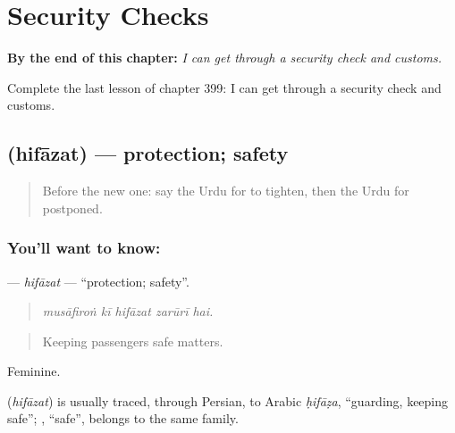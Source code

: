
\chapter{Security Checks}
\label{ch:ur-security-checks}

\begin{chapteropening}
\textbf{By the end of this chapter:} \emph{I can get through a security check and customs.}

Complete the last lesson of chapter 399: I can get through a security check and customs.
\end{chapteropening}

\section[\texorpdfstring{\ur{حفاظت} (hifāzat)}{حفاظت (hifāzat)}]{ (hifāzat) — protection; safety}

\label{lesson:UR-C399-hifazat}



\begin{quote}
Before the new one: say the Urdu for to tighten, then the Urdu for postponed.
\end{quote}

\subsection*{You'll want to know: }
\textbf{} — \emph{hifāzat} — \textquotedblleft{}protection; safety\textquotedblright{}.

\begin{quote}
    
\end{quote}

\begin{quote}
\emph{musāfiroṅ kī hifāzat zarūrī hai.}
\end{quote}

\begin{quote}
Keeping passengers safe matters.
\end{quote}

Feminine.

\begin{cousinweb}
\textbf{} (\emph{hifāzat}) is usually traced, through Persian, to Arabic \emph{ḥifāẓa}, \textquotedblleft{}guarding, keeping safe\textquotedblright{}; \textbf{}, \textquotedblleft{}safe\textquotedblright{}, belongs to the same family.
\end{cousinweb}

